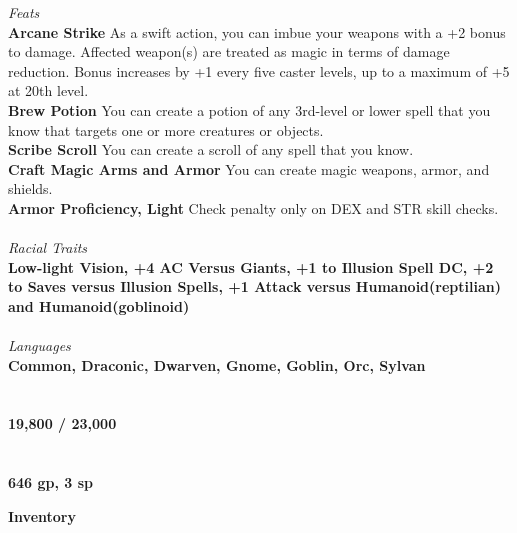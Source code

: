 \documentclass[letterpaper]{article}
\begin{document}
\noindent\emph{Feats} \\
\noindent\textbf{Arcane Strike} As a swift action, you can imbue your weapons with a +2 bonus to damage.  Affected weapon(s) are treated as magic in terms of damage reduction.  Bonus increases by +1 every five caster levels, up to a maximum of +5 at 20th level. \\
\noindent\textbf{Brew Potion} You can create a potion of any 3rd-level or lower spell that you know that targets one or more creatures or objects. \\
\noindent\textbf{Scribe Scroll} You can create a scroll of any spell that you know. \\
\noindent\textbf{Craft Magic Arms and Armor} You can create magic weapons, armor, and shields. \\
\noindent\textbf{Armor Proficiency, Light} Check penalty only on {\footnotesize DEX} and {\footnotesize STR} skill checks. \\
\\
\noindent\emph{Racial Traits} \\
\textbf{Low-light Vision, +4 AC Versus Giants, +1 to Illusion Spell DC, +2 to Saves versus Illusion Spells, +1 Attack versus Humanoid(reptilian) and Humanoid(goblinoid)} \\
\\
\noindent\emph{Languages} \\
\textbf{Common, Draconic, Dwarven, Gnome, Goblin, Orc, Sylvan} \\
\\
 \\
\textbf{19,800 / 23,000} \\
\\
 \\
\textbf{646 gp, 3 sp} \\

\pagebreak

\noindent \textbf{\huge{Inventory}} \\
\end{document}
